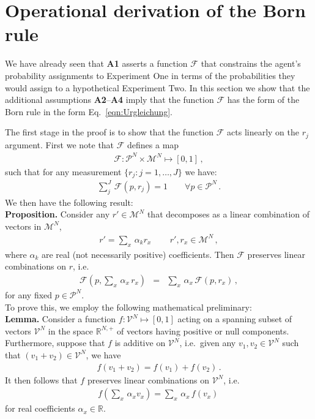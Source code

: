\documentclass[%
 reprint,superscriptaddress,
 amsmath,amssymb,
 aps,pra, onecolumn, 12pt
]{revtex4-2}
\newcommand{\eqn}[1]{\begin{eqnarray} #1 \end{eqnarray}}
\newcommand{\tbf}[1]{\textbf{#1}}
\newcommand{\zum}[2]{\displaystyle\sum_{#1}^{#2}}
\newcommand{\onestage}{{One}}
\newcommand{\twostage}{{Two}}
\begin{document}
\section{Operational derivation of the Born rule \label{sec:born}}

We have already seen that {\bf A1} asserts a function $\mathcal{F}$ that constrains the agent's probability assignments to Experiment \onestage{} in terms of the probabilities they would assign to a hypothetical Experiment \twostage. In this section we show that the additional assumptions {\bf A2}--{\bf A4} imply that the function $\mathcal{F}$ has the form of the Born rule in the form Eq.\ \eqref{eqn:Urgleichung}.

The first stage in the proof is to show that the function $\mathcal{F}$ acts linearly on the $r_j$ argument. First we note that $\mathcal{F}$ defines a map
\eqn{
\mathcal{F}: \mathcal{P}^N \times \mathcal{M}^N \mapsto [0,1] \, ,
}
such that for any measurement $\{r_j : j=1,\dots,J \}$ we have:
\eqn{ \label{eqn:frame_condition}
\zum{j}{J} \, \mathcal{F}(p,r_j) = 1 \qquad \forall p \in \mathcal{P}^N \, .
}
We then have the following result:\\

\tbf{Proposition.} Consider any $r' \in \mathcal{M}^N$ that decomposes as a linear combination of vectors in $\mathcal{M}^N$,
\eqn{
r' = \zum{x}{} \, \alpha_k r_x \, \qquad r',r_x \in \mathcal{M}^N \, ,
}
where $\alpha_k$ are real (not necessarily positive) coefficients. Then $\mathcal{F}$ preserves linear combinations on $r$, i.e.\
\eqn{ \label{eqn:linear_r}
\mathcal{F}\left(  p, \zum{x}{} \, \alpha_x \, r_{x} \right) &=& \zum{x}{} \, \alpha_x \, \mathcal{F}\left( p, r_{x} \right) \, ,
}
for any fixed $p \in \mathcal{P}^N$.\\

To prove this, we employ the following mathematical preliminary:\\

\tbf{Lemma.} Consider a function $f: \mathcal{V}^N \mapsto [0,1]$ acting on a spanning subset of vectors $\mathcal{V}^N$ in the space $\mathbb{R}^{N,+}$ of vectors having positive or null components. Furthermore, suppose that $f$ is additive on $\mathcal{V}^N$, i.e.\ given any $v_1,v_2 \in \mathcal{V}^N$ such that $(v_1+v_2) \in \mathcal{V}^N$, we have
\eqn{
f(v_1+v_2) = f(v_1) + f(v_2) \, .
}
It then follows that $f$ preserves linear combinations on $\mathcal{V}^N$, i.e.\
\eqn{ \label{eqn:prop2}
f\left( \zum{x}{} \, \alpha_x v_x \right) =  \zum{x}{} \, \alpha_x \, f\left(v_x \right) \,
}
for real coefficients $\alpha_x \in \mathbb{R}$.\\
\end{document}
